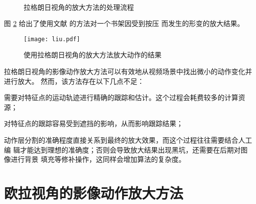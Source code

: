 \begin{figure}[htbp]
  \centering
  \qquad
  \qquad
  \\
  \qquad
  \qquad
  \caption{拉格朗日视角的放大方法的处理流程}
  \label{fig:lag}
\end{figure}

图 \ref{fig:liu} 给出了使用文献 \cite{liu2005motion} 的方法对一个书架因受到按压
而发生的形变的放大结果。

\clearpage

\begin{figure}[htbp]
  \centering
  \texttt{[image: liu.pdf]}
  \caption{使用拉格朗日视角的放大方法放大动作的结果}
  \label{fig:liu}
\end{figure}

拉格朗日视角的影像动作放大方法可以有效地从视频场景中找出微小的动作变化并进行放大。
然而，该方法存在以下几点不足：

\begin{compactenum}
\item 需要对特征点的运动轨迹进行精确的跟踪和估计。这个过程会耗费较多的计算资源；
\item 对特征点的跟踪容易受到遮挡的影响，从而影响跟踪结果；
\item 动作层分割的准确程度直接关系到最终的放大效果，而这个过程往往需要结合人工编
  辑才能达到理想的准确度；否则会导致放大结果出现黑坑，还需要在后期对图像进行背景
  填充等修补操作，这同样会增加算法的复杂度。
\end{compactenum}

\section{欧拉视角的影像动作放大方法}
\label{sec:eulerian}

